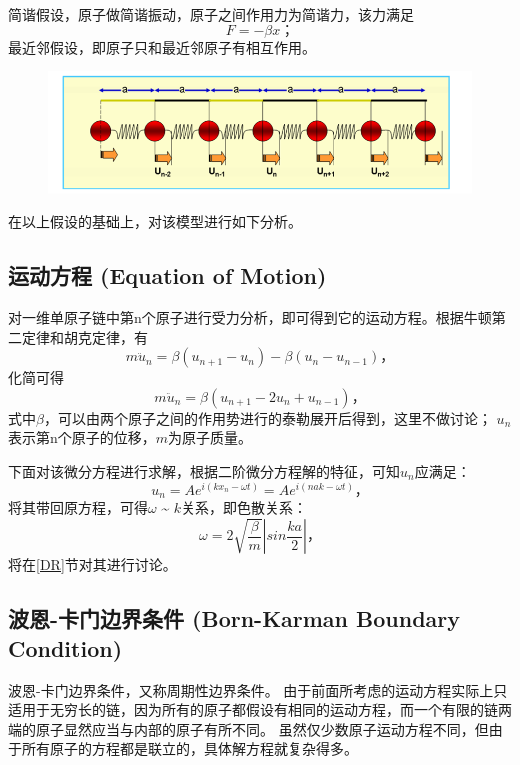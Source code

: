 \documentclass[declarePage]{ecnuthesis}
\begin{document}
简谐假设，原子做简谐振动，原子之间作用力为简谐力，该力满足
\begin{equation}
    F = - \beta x \text{；}
\end{equation}
最近邻假设，即原子只和最近邻原子有相互作用。
\begin{figure}[htb]
    \centering
    \includegraphics[width=.7\textwidth]{1DMC.png}
    \label{1DMC}
\end{figure}

在以上假设的基础上，对该模型进行如下分析。

\subsection{运动方程 (Equation of Motion)}

对一维单原子链中第n个原子进行受力分析，即可得到它的运动方程。根据牛顿第二定律和胡克定律，有
\begin{equation}
    m \ddot{u}_n = \beta (u_{n+1} - u_n) - \beta (u_n - u_{n-1}) \text{，}
\end{equation}
化简可得
\begin{equation}
    m \ddot{u}_n = \beta (u_{n+1} - 2u_n + u_{n-1}) \text{，}
\end{equation}
式中$\beta$，可以由两个原子之间的作用势进行的泰勒展开后得到，这里不做讨论；%
$u_n$表示第n个原子的位移，$m$为原子质量。

下面对该微分方程进行求解，根据二阶微分方程解的特征，可知$u_n$应满足：
\begin{equation}
    u_n = A e^{i(kx_n - \omega t)} = A e^{i(nak - \omega t)} \text{，} \label{EOM}
\end{equation}
将其带回原方程，可得$\omega$ \~{} $k$关系，即色散关系：
\begin{equation}
    \omega = 2 \sqrt{\frac{\beta}{m}} \left | sin \frac{ka}{2} \right | \text{，} \label{DRE}
\end{equation}
将在\ref{DR}节对其进行讨论。

\subsection{波恩-卡门边界条件 (Born-Karman Boundary Condition)}
波恩-卡门边界条件，又称周期性边界条件。%
由于前面所考虑的运动方程实际上只适用于无穷长的链，因为所有的原子都假设有相同的运动方程，而一个有限的链两端的原子显然应当与内部的原子有所不同。%
虽然仅少数原子运动方程不同，但由于所有原子的方程都是联立的，具体解方程就复杂得多。
\end{document}
